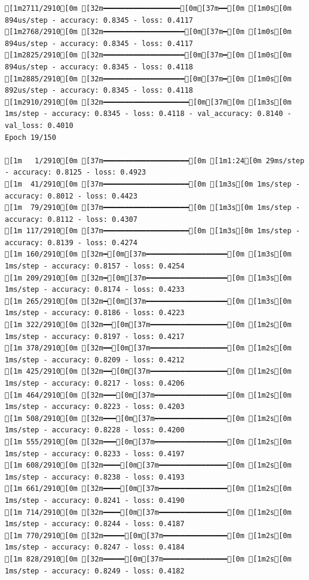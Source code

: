\documentclass[
  letterpaper,
  DIV=11,
  numbers=noendperiod]{scrartcl}
\begin{document}
\begin{verbatim}
[1m2711/2910[0m [32m━━━━━━━━━━━━━━━━━━[0m[37m━━[0m [1m0s[0m 894us/step - accuracy: 0.8345 - loss: 0.4117
[1m2768/2910[0m [32m━━━━━━━━━━━━━━━━━━━[0m[37m━[0m [1m0s[0m 894us/step - accuracy: 0.8345 - loss: 0.4117
[1m2825/2910[0m [32m━━━━━━━━━━━━━━━━━━━[0m[37m━[0m [1m0s[0m 894us/step - accuracy: 0.8345 - loss: 0.4118
[1m2885/2910[0m [32m━━━━━━━━━━━━━━━━━━━[0m[37m━[0m [1m0s[0m 892us/step - accuracy: 0.8345 - loss: 0.4118
[1m2910/2910[0m [32m━━━━━━━━━━━━━━━━━━━━[0m[37m[0m [1m3s[0m 1ms/step - accuracy: 0.8345 - loss: 0.4118 - val_accuracy: 0.8140 - val_loss: 0.4010
Epoch 19/150

[1m   1/2910[0m [37m━━━━━━━━━━━━━━━━━━━━[0m [1m1:24[0m 29ms/step - accuracy: 0.8125 - loss: 0.4923
[1m  41/2910[0m [37m━━━━━━━━━━━━━━━━━━━━[0m [1m3s[0m 1ms/step - accuracy: 0.8012 - loss: 0.4423   
[1m  79/2910[0m [37m━━━━━━━━━━━━━━━━━━━━[0m [1m3s[0m 1ms/step - accuracy: 0.8112 - loss: 0.4307
[1m 117/2910[0m [37m━━━━━━━━━━━━━━━━━━━━[0m [1m3s[0m 1ms/step - accuracy: 0.8139 - loss: 0.4274
[1m 160/2910[0m [32m━[0m[37m━━━━━━━━━━━━━━━━━━━[0m [1m3s[0m 1ms/step - accuracy: 0.8157 - loss: 0.4254
[1m 209/2910[0m [32m━[0m[37m━━━━━━━━━━━━━━━━━━━[0m [1m3s[0m 1ms/step - accuracy: 0.8174 - loss: 0.4233
[1m 265/2910[0m [32m━[0m[37m━━━━━━━━━━━━━━━━━━━[0m [1m3s[0m 1ms/step - accuracy: 0.8186 - loss: 0.4223
[1m 322/2910[0m [32m━━[0m[37m━━━━━━━━━━━━━━━━━━[0m [1m2s[0m 1ms/step - accuracy: 0.8197 - loss: 0.4217
[1m 378/2910[0m [32m━━[0m[37m━━━━━━━━━━━━━━━━━━[0m [1m2s[0m 1ms/step - accuracy: 0.8209 - loss: 0.4212
[1m 425/2910[0m [32m━━[0m[37m━━━━━━━━━━━━━━━━━━[0m [1m2s[0m 1ms/step - accuracy: 0.8217 - loss: 0.4206
[1m 464/2910[0m [32m━━━[0m[37m━━━━━━━━━━━━━━━━━[0m [1m2s[0m 1ms/step - accuracy: 0.8223 - loss: 0.4203
[1m 508/2910[0m [32m━━━[0m[37m━━━━━━━━━━━━━━━━━[0m [1m2s[0m 1ms/step - accuracy: 0.8228 - loss: 0.4200
[1m 555/2910[0m [32m━━━[0m[37m━━━━━━━━━━━━━━━━━[0m [1m2s[0m 1ms/step - accuracy: 0.8233 - loss: 0.4197
[1m 608/2910[0m [32m━━━━[0m[37m━━━━━━━━━━━━━━━━[0m [1m2s[0m 1ms/step - accuracy: 0.8238 - loss: 0.4193
[1m 661/2910[0m [32m━━━━[0m[37m━━━━━━━━━━━━━━━━[0m [1m2s[0m 1ms/step - accuracy: 0.8241 - loss: 0.4190
[1m 714/2910[0m [32m━━━━[0m[37m━━━━━━━━━━━━━━━━[0m [1m2s[0m 1ms/step - accuracy: 0.8244 - loss: 0.4187
[1m 770/2910[0m [32m━━━━━[0m[37m━━━━━━━━━━━━━━━[0m [1m2s[0m 1ms/step - accuracy: 0.8247 - loss: 0.4184
[1m 828/2910[0m [32m━━━━━[0m[37m━━━━━━━━━━━━━━━[0m [1m2s[0m 1ms/step - accuracy: 0.8249 - loss: 0.4182

\end{verbatim}
\end{document}
